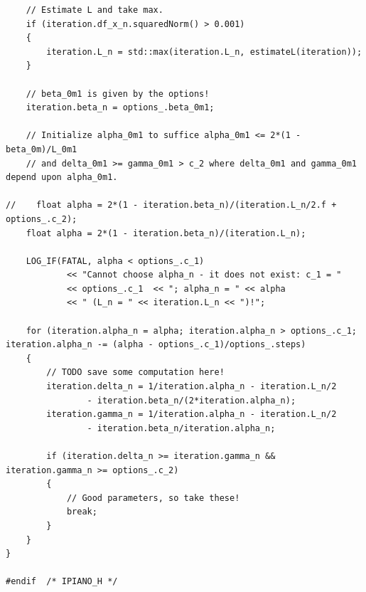 \documentclass[onecolumn,final,a4paper,13pt,reqno]{siamart}
\begin{document}
\begin{appendix}
\begin{lstlisting}
    // Estimate L and take max.
    if (iteration.df_x_n.squaredNorm() > 0.001)
    {
        iteration.L_n = std::max(iteration.L_n, estimateL(iteration));
    }
    
    // beta_0m1 is given by the options!
    iteration.beta_n = options_.beta_0m1;
    
    // Initialize alpha_0m1 to suffice alpha_0m1 <= 2*(1 - beta_0m)/L_0m1
    // and delta_0m1 >= gamma_0m1 > c_2 where delta_0m1 and gamma_0m1 depend upon alpha_0m1.
    
//    float alpha = 2*(1 - iteration.beta_n)/(iteration.L_n/2.f + options_.c_2);
    float alpha = 2*(1 - iteration.beta_n)/(iteration.L_n);
    
    LOG_IF(FATAL, alpha < options_.c_1)
            << "Cannot choose alpha_n - it does not exist: c_1 = " 
            << options_.c_1  << "; alpha_n = " << alpha 
            << " (L_n = " << iteration.L_n << ")!";
                
    for (iteration.alpha_n = alpha; iteration.alpha_n > options_.c_1; iteration.alpha_n -= (alpha - options_.c_1)/options_.steps)
    {
        // TODO save some computation here!
        iteration.delta_n = 1/iteration.alpha_n - iteration.L_n/2 
                - iteration.beta_n/(2*iteration.alpha_n);
        iteration.gamma_n = 1/iteration.alpha_n - iteration.L_n/2 
                - iteration.beta_n/iteration.alpha_n;

        if (iteration.delta_n >= iteration.gamma_n && iteration.gamma_n >= options_.c_2)
        {
            // Good parameters, so take these!
            break;
        }
    }
}

#endif	/* IPIANO_H */
	\end{lstlisting}
\end{appendix}
\end{document}
